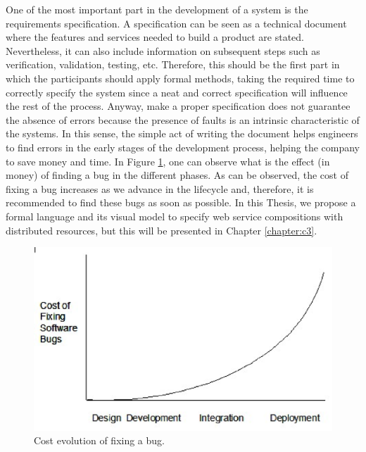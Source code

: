 One of the most important part in the development of a system is the requirements specification. 
A specification can be seen as a technical document where the features and services needed 
to build a product are stated. Nevertheless, it can also include information on 
subsequent steps such as verification, validation, testing, etc. Therefore, 
this should be the first part in which the participants should apply formal methods, taking the 
required time to correctly specify the system since a neat and correct specification will influence the 
rest of the process.
Anyway, make a proper specification does not guarantee the absence of errors because the 
presence of faults is an intrinsic characteristic of the systems. In this sense, 
the simple act of writing the document helps engineers to find errors in the early stages 
of the development process, helping the company to save  money and time. 
In Figure \ref{fig:coste}, one can observe what is the effect (in money) of finding a bug
in the different phases. As can be observed, the cost of fixing a bug increases as 
we advance in the lifecycle and, therefore, it is recommended to find these bugs as soon as possible. 
In this Thesis, we propose a formal language and its visual model to specify web service compositions 
with distributed resources, but this will be presented in Chapter \ref{chapter:c3}.

\begin{figure}
\begin{center}
  \includegraphics[scale=0.5, width =\columnwidth]{Figures/coste}
\end{center}
  \caption{Cost evolution of fixing a bug.}
  \label{fig:coste}
\end{figure}

